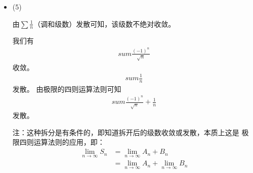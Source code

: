 \documentclass{article}
\begin{document}
\begin{itemize}
\begin{itemize}
                考虑条件收敛，对于交错级数$\sum (-1) \frac{1}{n^p}$，由莱布尼茨判别法可知其收敛。
                又有
                \begin{align*}
                  (\sqrt[x]{x})'
                   & = (e^{\ln\, \sqrt[x]{x}})'                                     \\
                   & = (e^{\frac{1}{x} \ln\, x})'                                   \\
                   & = e^{\frac{1}{x} \ln\, x} \left[\frac{1 - \ln\, x}{x^2}\right] \\
                   & = \sqrt[x]{x} \left[\frac{1 - \ln\, x}{x^2}\right]
                \end{align*}
                所以，$x > e$时，函数$\sqrt[x]{x}$单减，由归结原理可知，$n > 3$时，$\sqrt[n]{n}$单调且有界，
                因为改变级数的有限项并不影响原有级数的敛散性，因此利用阿贝尔判别法，
                级数收敛。
        \end{itemize}

  \item (5)

        由$\sum \frac{1}{n}$（调和级数）发散可知，该级数不绝对收敛。

        我们有
        \begin{align*}
          sum \frac{(-1)^n}{\sqrt{n}}
        \end{align*}
        收敛。
        \begin{align*}
          sum \frac{1}{n}
        \end{align*}
        发散。
        由极限的四则运算法则可知
        \begin{align*}
          sum \frac{(-1)^n}{\sqrt{n}} + \frac{1}{n}
        \end{align*}
        发散。

        注：这种拆分是有条件的，即知道拆开后的级数收敛或发散，本质上这是
        极限四则运算法则的应用，即：
        \begin{align*}
          \lim\limits_{n \to \infty} S_n
           & = \lim\limits_{n \to \infty} A_n + B_n                            \\
           & = \lim\limits_{n \to \infty} A_n + \lim\limits_{n \to \infty} B_n
        \end{align*}


\end{itemize}
\end{document}
